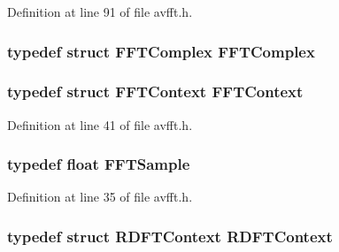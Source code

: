 Definition at line 91 of file avfft.\+h.

\subsubsection[{\texorpdfstring{F\+F\+T\+Complex}{FFTComplex}}]{\setlength{\rightskip}{0pt plus 5cm}typedef struct {\bf F\+F\+T\+Complex}  {\bf F\+F\+T\+Complex}}\hypertarget{group__lavc__fft_gab074aa9c1667258670818f7ed88375ee}{}\label{group__lavc__fft_gab074aa9c1667258670818f7ed88375ee}
\subsubsection[{\texorpdfstring{F\+F\+T\+Context}{FFTContext}}]{\setlength{\rightskip}{0pt plus 5cm}typedef struct {\bf F\+F\+T\+Context} {\bf F\+F\+T\+Context}}\hypertarget{group__lavc__fft_gaac01e094370275491c7cbc580de0fe24}{}\label{group__lavc__fft_gaac01e094370275491c7cbc580de0fe24}


Definition at line 41 of file avfft.\+h.

\subsubsection[{\texorpdfstring{F\+F\+T\+Sample}{FFTSample}}]{\setlength{\rightskip}{0pt plus 5cm}typedef float {\bf F\+F\+T\+Sample}}\hypertarget{group__lavc__fft_gaa306dc16df543b25d9910debc3f76b96}{}\label{group__lavc__fft_gaa306dc16df543b25d9910debc3f76b96}


Definition at line 35 of file avfft.\+h.

\subsubsection[{\texorpdfstring{R\+D\+F\+T\+Context}{RDFTContext}}]{\setlength{\rightskip}{0pt plus 5cm}typedef struct {\bf R\+D\+F\+T\+Context} {\bf R\+D\+F\+T\+Context}}\hypertarget{group__lavc__fft_gad6a19df0e8cfc4d67a325e4f91fd9cd9}{}\label{group__lavc__fft_gad6a19df0e8cfc4d67a325e4f91fd9cd9}


